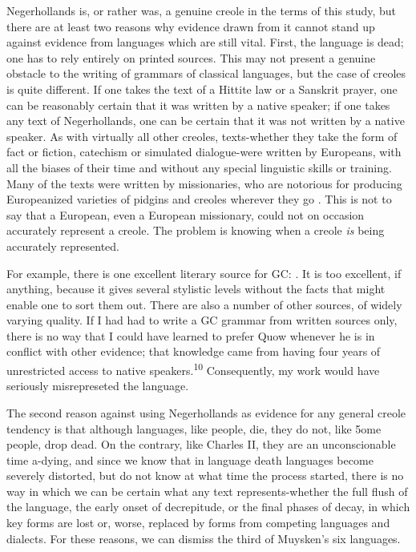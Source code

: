 Negerhollands is, or rather was, a genuine creole in the terms of this study, but there are at least two reasons why evidence drawn from it cannot stand up against evidence from languages which are still vital. First, the language is dead; one has to rely entirely on printed sources. This may not present a genuine obstacle to the writing of grammars of classical languages, but the case of creoles is quite different. If one takes the text of a Hittite law or a Sanskrit prayer, one can be reasonably certain that it was written by a native speaker; if one takes any text of Negerhollands, one can be certain that it was not written by a native speaker. As with virtually all other creoles, texts-whether they take the form of fact or fiction, catechism or simulated dialogue-were written by Europeans, with all the biases of their time and without any special linguistic skills or training. Many of the texts were written by missionaries, who are notorious for producing Europeanized varieties of pidgins and creoles wherever they go \citep{Voorhoeve1971}. This is not to say that a European, even a European missionary, could not on occasion accurately represent a creole. The problem is knowing when a creole \textit{is} being accurately represented.

For example, there is one excellent literary source for GC: \citet{Quow1877}. It is too excellent, if anything, because it gives several stylistic levels without the facts that might enable one to sort them out. There are also a number of other sources, of widely varying quality. If I had had to write a GC grammar from written sources only, there is no way that I could have learned to prefer Quow whenever he is in conflict with other evidence; that knowledge came from having four years of unrestricted access to native speakers.\textsuperscript{10} Consequently, my work would have seriously misrepreseted the language.


The second reason against using Negerhollands as evidence for any general creole tendency is that although languages, like people, die, they do not, like 5ome people, drop dead. On the contrary, like Charles II, they are an unconscionable time a-dying, and since we know that in language death languages become severely distorted, but do not know at what time the process started, there is no way in which we can be certain what any text represents-whether the full flush of the language, the early onset of decrepitude, or the final phases of decay, in which key forms are lost or, worse, replaced by forms from competing languages and dialects. For these reasons, we can dismiss the third of Muysken's six languages.

